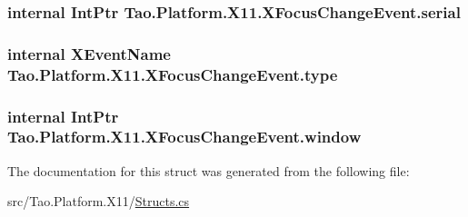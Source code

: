 \label{struct_tao_1_1_platform_1_1_x11_1_1_x_focus_change_event_a6e500a566f49a40f29311262595a01be}
\hypertarget{struct_tao_1_1_platform_1_1_x11_1_1_x_focus_change_event_a4b1d5610b7f0f0bdf914665368e07eb9}{
\subsubsection[{serial}]{\setlength{\rightskip}{0pt plus 5cm}internal IntPtr {\bf Tao.Platform.X11.XFocusChangeEvent.serial}}}
\label{struct_tao_1_1_platform_1_1_x11_1_1_x_focus_change_event_a4b1d5610b7f0f0bdf914665368e07eb9}
\hypertarget{struct_tao_1_1_platform_1_1_x11_1_1_x_focus_change_event_a42da970ca7df948bf965ea4b1a7ef816}{
\subsubsection[{type}]{\setlength{\rightskip}{0pt plus 5cm}internal {\bf XEventName} {\bf Tao.Platform.X11.XFocusChangeEvent.type}}}
\label{struct_tao_1_1_platform_1_1_x11_1_1_x_focus_change_event_a42da970ca7df948bf965ea4b1a7ef816}
\hypertarget{struct_tao_1_1_platform_1_1_x11_1_1_x_focus_change_event_a44ce41f06ce31f8f33e3e65c0a7c3f59}{
\subsubsection[{window}]{\setlength{\rightskip}{0pt plus 5cm}internal IntPtr {\bf Tao.Platform.X11.XFocusChangeEvent.window}}}
\label{struct_tao_1_1_platform_1_1_x11_1_1_x_focus_change_event_a44ce41f06ce31f8f33e3e65c0a7c3f59}


The documentation for this struct was generated from the following file:\begin{DoxyCompactItemize}
\item 
src/Tao.Platform.X11/\hyperlink{_structs_8cs}{Structs.cs}\end{DoxyCompactItemize}
